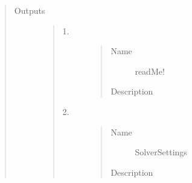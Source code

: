 \documentclass[letterpaper,10pt,english]{sphinxmanual}
\begin{document}
\begin{quote}
\begin{description}
\begin{quote}
\begin{description}
\begin{quote}
\begin{description}
\end{description}\end{quote}

\end{description}\end{quote}

\item[{Outputs}] \leavevmode\begin{quote}\begin{description}
\item[{1.}] \leavevmode\begin{quote}\begin{description}
\item[{Name}] \leavevmode
readMe!

\item[{Description}] \leavevmode
{}

\end{description}\end{quote}

\item[{2.}] \leavevmode\begin{quote}\begin{description}
\item[{Name}] \leavevmode
SolverSettings

\item[{Description}] \leavevmode
{}

\end{description}\end{quote}

\end{description}\end{quote}

\end{description}\end{quote}
\end{document}
